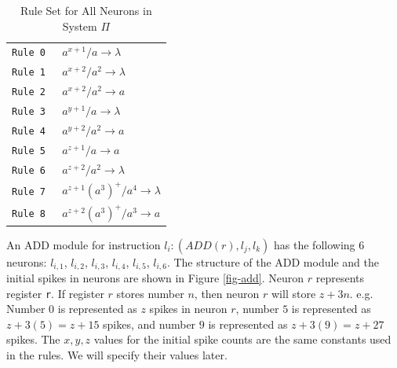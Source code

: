 \documentclass[runningheads,a4paper]{llncs}
\begin{document}
\begin{table}[H]
\begin{center}
\begin{tabular}{|r|l|}
\hline
\tt{Rule 0}  & $a^{x+1}/a          \rightarrow \lambda$  \\ 
\tt{Rule 1}  & $a^{x+2}/a^2        \rightarrow \lambda$  \\ 
\tt{Rule 2}  & $a^{x+2}/a^2        \rightarrow a$        \\ \hline 
\tt{Rule 3}  & $a^{y+1}/a          \rightarrow \lambda$  \\ 
\tt{Rule 4}  & $a^{y+2}/a^2        \rightarrow a$        \\ \hline
\tt{Rule 5}  & $a^{z+1}/a          \rightarrow a$        \\ 
\tt{Rule 6}  & $a^{z+2}/a^2        \rightarrow \lambda$  \\ 
\tt{Rule 7}  & $a^{z+1}(a^3)^+/a^4 \rightarrow \lambda$  \\
\tt{Rule 8}  & $a^{z+2}(a^3)^+/a^3 \rightarrow a$        \\ \hline
\end{tabular}
\end{center}
\caption{Rule Set for All Neurons in System $\Pi$}
\label{table-rules}
\end{table}



An ADD module for instruction $l_i:(ADD(r), l_j, l_k)$ has the following 6 neurons: $l_{i,1}$, $l_{i,2}$, $l_{i,3}$, $l_{i,4}$, $l_{i,5}$, $l_{i,6}$.
The structure of the ADD module and the initial spikes in neurons are shown in Figure \ref{fig-add}. Neuron $r$ represents register \texttt{r}. If 
register $r$ stores number $n$, then neuron $r$ will store $z+3n$. e.g. Number 0 is represented as $z$ spikes in neuron $r$, number $5$ is represented 
as $z+3(5)=z+15$ spikes, and number $9$ is represented as $z+3(9)=z+27$ spikes. The  $x,y,z$ values for the initial spike counts are the same 
constants used in the rules. We will specify their values later.
\end{document}
